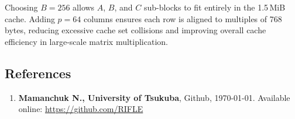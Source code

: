 \documentclass[11pt]{article}
\begin{document}
Choosing $B=256$ allows $A$, $B$, and $C$ sub-blocks to fit entirely in the 1.5\,MiB cache. Adding $p=64$ columns ensures each row is aligned to multiples of 768\,bytes, reducing excessive cache set collisions and improving overall cache efficiency in large-scale matrix multiplication.


\setlength{\fboxsep}{0pt} %
\setlength{\fboxrule}{0.5pt} %


\subsection*{References}
\begin{enumerate}
    \item \textbf{Mamanchuk N., University of Tsukuba}, Github, \today. Available online: \url{https://github.com/RIFLE}
\end{enumerate}
\end{document}
